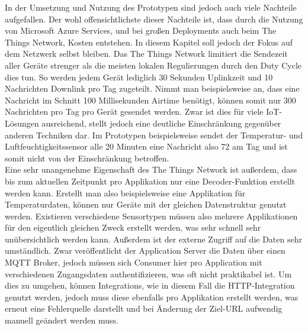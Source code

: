 In der Umsetzung und Nutzung des Prototypen sind jedoch auch viele Nachteile aufgefallen. Der wohl offensichtlichste dieser Nachteile ist, dass durch die Nutzung von Microsoft Azure Services, und bei großen Deployments auch beim The Things Network, Kosten entstehen. In diesem Kapitel soll jedoch der Fokus auf dem Netzwerk selbst bleiben. Das The Things Network limitiert die Sendezeit aller Geräte strenger als die meisten lokalen Regulierungen durch den Duty Cycle dies tun. So werden jedem Gerät lediglich 30 Sekunden Uplinkzeit und 10 Nachrichten Downlink pro Tag zugeteilt. Nimmt man beispielsweise an, dass eine Nachricht im Schnitt 100 Millisekunden Airtime benötigt, können somit nur 300 Nachrichten pro Tag pro Gerät gesendet werden. Zwar ist dies für viele IoT-Lösungen ausreichend, stellt jedoch eine deutliche Einschränkung gegenüber anderen Techniken dar. Im Prototypen beispielsweise sendet der Temperatur- und Luftfeuchtigkeitssensor alle 20 Minuten eine Nachricht also 72 am Tag und ist somit nicht von der Einschränkung betroffen. \\
Eine sehr unangenehme Eigenschaft des The Things Network ist außerdem, dass bis zum aktuellen Zeitpunkt pro Applikation nur eine Decoder-Funktion erstellt werden kann. Erstellt man also beispielsweise eine Appli\-kation für Temperaturdaten, können nur Geräte mit der gleichen Datenstruktur genutzt werden. Existieren verschiedene Sensortypen müssen also mehrere Applikationen für den eigentlich gleichen Zweck erstellt werden, was sehr schnell sehr unübersichtlich werden kann. Außerdem ist der externe Zugriff auf die Daten sehr umständlich. Zwar veröffentlicht der Application Server die Daten über einen MQTT Broker, jedoch müssen sich Consumer hier pro Application mit verschiedenen Zugangsdaten authentifizieren, was oft nicht praktikabel ist. Um dies zu umgehen, können Integrations, wie in diesem Fall die HTTP-Integration genutzt werden, jedoch muss diese ebenfalls pro Applikation erstellt werden, was erneut eine Fehlerquelle darstellt und bei Änderung der Ziel-URL aufwendig manuell geändert werden muss.\\
